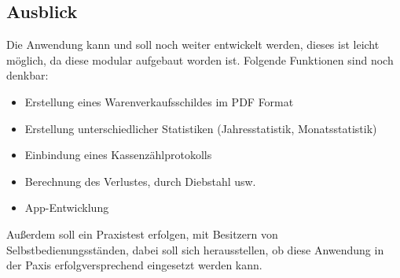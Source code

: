 \newpage

\subsection{Ausblick}\label{ausblick}

Die Anwendung kann und soll noch weiter entwickelt werden, dieses ist leicht möglich, da diese modular aufgebaut worden ist. Folgende Funktionen sind noch denkbar:

\begin{itemize}
	\item Erstellung eines Warenverkaufsschildes im PDF Format
	\item Erstellung unterschiedlicher Statistiken (Jahresstatistik, Monatsstatistik)
	\item Einbindung eines Kassenzählprotokolls
	\item Berechnung des Verlustes, durch Diebstahl usw.
	\item App-Entwicklung 
\end{itemize}

Außerdem soll ein Praxistest erfolgen, mit Besitzern von Selbstbedienungsständen, dabei soll sich herausstellen, ob diese Anwendung in der Paxis erfolgversprechend eingesetzt werden kann.
\\
